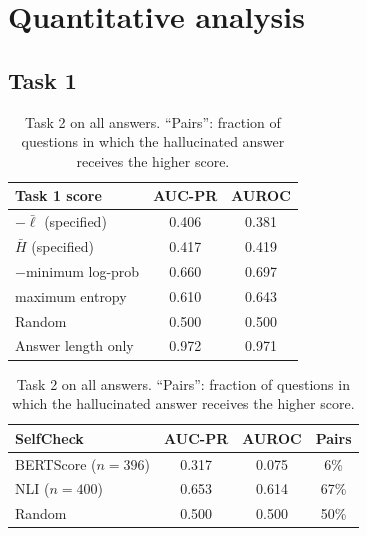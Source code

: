 \documentclass[11pt,a4paper]{article}
\begin{document}
\section{Quantitative analysis}\label{sec:quant}

\subsection{Task 1}

\begin{table}[tb]
\centering\small
\begin{minipage}[t]{0.42\textwidth}\centering
\begin{tabular}{lcc}
\toprule
Task 1 score & AUC-PR & AUROC \\
\midrule
$-\bar{\ell}$ (specified)  & 0.406 & 0.381 \\
$\bar{H}$ (specified)      & 0.417 & 0.419 \\
$-$minimum log-prob        & 0.660 & 0.697 \\
maximum entropy            & 0.610 & 0.643 \\
\midrule
Random                     & 0.500 & 0.500 \\
Answer length only         & 0.972 & 0.971 \\
\bottomrule
\end{tabular}
\caption{Task 1 on all 400 answers.}
\label{tab:task1}
\end{minipage}\hfill
\begin{minipage}[t]{0.54\textwidth}\centering
\begin{tabular}{lccc}
\toprule
SelfCheck & AUC-PR & AUROC & Pairs \\
\midrule
BERTScore ($n=396$) & 0.317 & 0.075 & 6\% \\
NLI ($n=400$)       & 0.653 & 0.614 & 67\% \\
\midrule
Random                        & 0.500 & 0.500 & 50\% \\
\bottomrule
\end{tabular}
\caption{Task 2 on all answers. ``Pairs'': fraction of questions in which the
hallucinated answer receives the higher score.}
\label{tab:task2}
\end{minipage}
\end{table}
\end{document}
